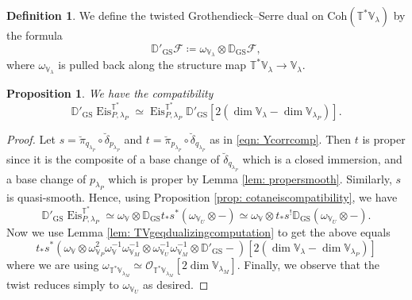 \documentclass{amsart}
\newtheorem{proposition}[theorem]{Proposition}
\theoremstyle{definition}
\newtheorem{definition}[theorem]{Definition}
\theoremstyle{remark}
\numberwithin{equation}{section}
\newcommand{\mc}{\mathcal}
\newcommand{\D}{\mathbb{D}}
\DeclareMathOperator{\Eis}{\mathrm{Eis}}
\newcommand{\Coh}{\mathrm{Coh}}
\newcommand{\GS}{\mathrm{GS}}
\newcommand{\V}{\mathbb{V}}
\newcommand{\T}{\mathbb{T}}
\begin{document}
\begin{definition}{\label{defn: twistedGS}}
    We define the twisted Grothendieck--Serre dual on $\Coh(\T^{\ast}\V_{\lambda})$ by the formula 
    \begin{equation*}
\D'_{\GS}\mc F \coloneq \omega_{\V_\lambda}\otimes \D_{\GS}\mc F, 
    \end{equation*}
    where $\omega_{\V_\lambda}$ is pulled back along the structure map $\T^* \V_{\lambda}\to \V_\lambda$. 
\end{definition}
\begin{proposition}{\label{prop: twistedGSEiscompatibility}}
    We have the compatibility
    \begin{equation*}
        \D'_{\GS} \Eis^{\T^{\ast}}_{P, \lambda_P} \simeq \Eis^{\T^{\ast}}_{P, \lambda_P} \D'_{\GS} [2( \dim \V_{\lambda} - \dim \V_{\lambda_P})].
    \end{equation*}
\end{proposition}
\begin{proof}
    Let $s = \breve{\pi}_{q_{\lambda_P}} \circ \breve{\delta}_{p_{\lambda_P}}$ and $t = \breve{\pi}_{p_{\lambda_P}} \circ \breve{\delta}_{q_{\lambda_P}}$ as in \eqref{eqn: Ycorrcomp}. Then $t$ is proper since it is the composite of a base change of $\breve{\delta}_{q_{\lambda_P}}$ which is a closed immersion, and a base change of $p_{\lambda_P}$ which is proper by Lemma \ref{lem: propersmooth}. Similarly, $s$ is quasi-smooth. Hence, using Proposition \ref{prop: cotaneiscompatibility}, we have
    \begin{equation*}
        \D'_{\GS} \Eis^{\T^{\ast}}_{P, \lambda_P} \simeq \omega_{\V} \otimes \D_{\GS} t_{\ast}s^{\ast} ( \omega_{\V_U}\otimes-) \simeq \omega_{\V} \otimes t_{\ast}s^{!} \D_{\GS} ( \omega_{\V_U}\otimes-).
    \end{equation*}
    Now we use Lemma \ref{lem: TVgeqdualizingcomputation} to get the above equals
    \begin{equation*}
      t_{\ast} s^{\ast} (\omega_{\V} \otimes \omega^2_{\V_P}\omega^{-1}_{\V}\omega^{-1}_{\V_M} \otimes \omega^{-1}_{\V_U} \omega^{-1}_{\V_M} \otimes  \D'_{\GS} -)[2( \dim \V_{\lambda} - \dim \V_{\lambda_P})]
    \end{equation*}
    where we are using $\omega_{\T^*\V_{\lambda_M}}\simeq \mc O_{\T^*\V_{\lambda_M}}[2\dim \V_{\lambda_M}]$. Finally, we observe that the twist reduces simply to $\omega_{\V_U}$ as desired.
\end{proof}
\end{document}

